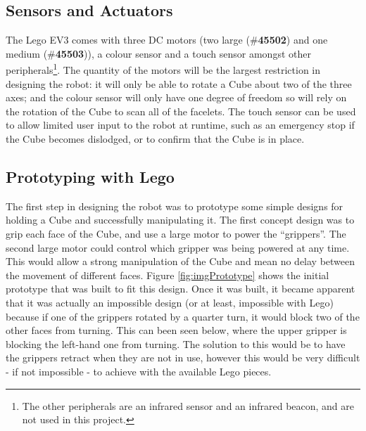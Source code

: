 \documentclass{report}
\newcommand{\tbo}[1]{\textbf{#1}}
\newcommand{\legopiece}[1]{(\#\tbo{#1})}
\begin{document}
    \subsection{Sensors and Actuators}
    
    The Lego EV3 comes with three DC motors (two large \legopiece{45502} and one medium \legopiece{45503}), a colour sensor and a touch sensor amongst other peripherals\footnote{The other peripherals are an infrared sensor and an infrared beacon, and are not used in this project.}. The quantity of the motors will be the largest restriction in designing the robot: it will only be able to rotate a Cube about two of the three axes; and the colour sensor will only have one degree of freedom so will rely on the rotation of the Cube to scan all of the facelets. The touch sensor can be used to allow limited user input to the robot at runtime, such as an emergency stop if the Cube becomes dislodged, or to confirm that the Cube is in place.
    
    \subsection{Prototyping with Lego}
    
    The first step in designing the robot was to prototype some simple designs for holding a Cube and successfully manipulating it. The first concept design was to grip each face of the Cube, and use a large motor to power the \enquote{grippers}. The second large motor could control which gripper was being powered at any time. This would allow a strong manipulation of the Cube and mean no delay between the movement of different faces. Figure \ref{fig:imgPrototype} shows the initial prototype that was built to fit this design. Once it was built, it became apparent that it was actually an impossible design (or at least, impossible with Lego) because if one of the grippers rotated by a quarter turn, it would block two of the other faces from turning. This can been seen below, where the upper gripper is blocking the left-hand one from turning. The solution to this would be to have the grippers retract when they are not in use, however this would be very difficult - if not impossible - to achieve with the available Lego pieces.
    
\end{document}
